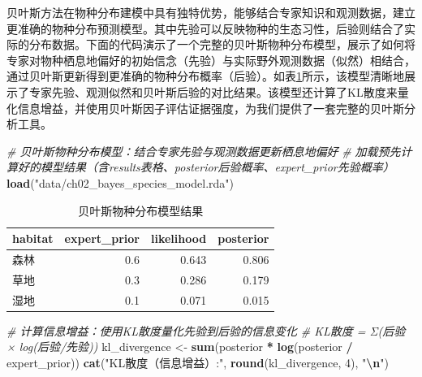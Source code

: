 \documentclass[
  twoside,12pt,fontset=none]{ctexbook}
\newenvironment{Shaded}{\begin{snugshade}}{\end{snugshade}}
\newcommand{\CommentTok}[1]{\textcolor[rgb]{0.56,0.35,0.01}{\textit{#1}}}
\newcommand{\DecValTok}[1]{\textcolor[rgb]{0.00,0.00,0.81}{#1}}
\newcommand{\FunctionTok}[1]{\textcolor[rgb]{0.13,0.29,0.53}{\textbf{#1}}}
\newcommand{\NormalTok}[1]{#1}
\newcommand{\OtherTok}[1]{\textcolor[rgb]{0.56,0.35,0.01}{#1}}
\newcommand{\SpecialCharTok}[1]{\textcolor[rgb]{0.81,0.36,0.00}{\textbf{#1}}}
\newcommand{\StringTok}[1]{\textcolor[rgb]{0.31,0.60,0.02}{#1}}
\begin{document}
贝叶斯方法在物种分布建模中具有独特优势，能够结合专家知识和观测数据，建立更准确的物种分布预测模型。其中先验可以反映物种的生态习性，后验则结合了实际的分布数据。下面的代码演示了一个完整的贝叶斯物种分布模型，展示了如何将专家对物种栖息地偏好的初始信念（先验）与实际野外观测数据（似然）相结合，通过贝叶斯更新得到更准确的物种分布概率（后验）。如表\ref{tab:bayesian-species-distribution}所示，该模型清晰地展示了专家先验、观测似然和贝叶斯后验的对比结果。该模型还计算了KL散度来量化信息增益，并使用贝叶斯因子评估证据强度，为我们提供了一套完整的贝叶斯分析工具。

\begin{Shaded}
\begin{Highlighting}[]
\CommentTok{\# 贝叶斯物种分布模型：结合专家先验与观测数据更新栖息地偏好}
\CommentTok{\# 加载预先计算好的模型结果（含results表格、posterior后验概率、expert\_prior先验概率）}
\FunctionTok{load}\NormalTok{(}\StringTok{"data/ch02\_bayes\_species\_model.rda"}\NormalTok{)}
\end{Highlighting}
\end{Shaded}

\begin{table}[!h]
\centering
\caption{\label{tab:bayesian-species-distribution}贝叶斯物种分布模型结果}
\centering
\begin{tabular}[t]{lrrr}
\toprule
habitat & expert\_prior & likelihood & posterior\\
\midrule
森林 & 0.6 & 0.643 & 0.806\\
草地 & 0.3 & 0.286 & 0.179\\
湿地 & 0.1 & 0.071 & 0.015\\
\bottomrule
\end{tabular}
\end{table}

\begin{Shaded}
\begin{Highlighting}[]
\CommentTok{\# 计算信息增益：使用KL散度量化先验到后验的信息变化}
\CommentTok{\# KL散度 = Σ(后验 × log(后验/先验))}
\NormalTok{kl\_divergence }\OtherTok{\textless{}{-}} \FunctionTok{sum}\NormalTok{(posterior }\SpecialCharTok{*} \FunctionTok{log}\NormalTok{(posterior }\SpecialCharTok{/}\NormalTok{ expert\_prior))}
\FunctionTok{cat}\NormalTok{(}\StringTok{"KL散度（信息增益）:"}\NormalTok{, }\FunctionTok{round}\NormalTok{(kl\_divergence, }\DecValTok{4}\NormalTok{), }\StringTok{"}\SpecialCharTok{\textbackslash{}n}\StringTok{"}\NormalTok{)}
\end{Highlighting}
\end{Shaded}
\end{document}
